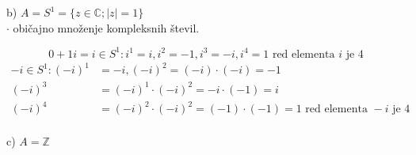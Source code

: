 \documentclass[12pt]{article}
\begin{document}
\noindent
b) $A = S^1 = \{ z \in \mathbb{C}; |z| = 1 \}$ \\
\hspace*{1em} $\cdot$ običajno množenje kompleksnih števil.
\begin{center}
\end{center}
$$
0 + 1i = i \in S^1: i^1 = i, i^2 = -1, i^3 = -i, i^4 = 1 \text{ red elementa } i \text{ je 4}
$$
\begin{align*}
    -i \in S^1: (-i)^1 &= -i, (-i)^2 = (-i) \cdot (-i) = -1 \\
    (-i)^3 &= (-i)^1 \cdot (-i)^2 = -i \cdot (-1) = i \\
    (-i)^4 &= (-i)^2 \cdot (-i)^2 = (-1) \cdot (-1) = 1 \text{ red elementa } -i \text{ je 4}
\end{align*} \\

\noindent
c) $A = \mathbb{Z}$
\end{document}
